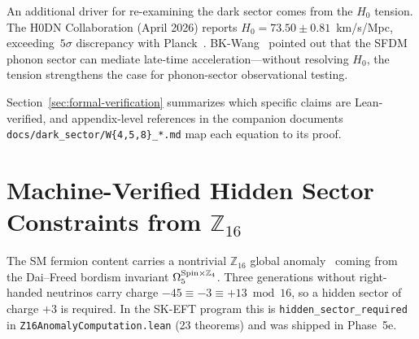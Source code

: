 \documentclass[aps,prd,twocolumn,showpacs,superscriptaddress,nofootinbib]{revtex4-2}
\begin{document}
An additional driver for re-examining the dark sector comes from the $H_0$
tension. The H0DN Collaboration (April 2026) reports
$H_0 = 73.50 \pm 0.81$~km/s/Mpc, exceeding~$5\sigma$ discrepancy with
Planck~\cite{Planck2018}. BK-Wang~\cite{BKWang2017} pointed out that the
SFDM phonon sector can mediate late-time acceleration---without resolving
$H_0$, the tension strengthens the case for phonon-sector observational
testing.

Section~\ref{sec:formal-verification} summarizes which specific claims are
Lean-verified, and appendix-level references in the companion documents
\texttt{docs/dark\_sector/W\{4,5,8\}\_*.md} map each equation to its proof.

\section{Machine-Verified Hidden Sector Constraints from $\mathbb{Z}_{16}$}
\label{sec:z16}

The SM fermion content carries a nontrivial $\mathbb{Z}_{16}$ global
anomaly~\cite{Wan2019,Wang2020,Garcia-Etxebarria2019} coming from the
Dai--Freed bordism invariant $\Omega^{{\rm Spin} \times \mathbb{Z}_4}_5$.
Three generations without right-handed neutrinos carry charge
$-45 \equiv -3 \equiv +13 \bmod 16$, so a hidden sector of charge $+3$
is required. In the SK-EFT program this is \texttt{hidden\_sector\_required}
in \texttt{Z16AnomalyComputation.lean} (23 theorems) and was shipped in
Phase~5e.
\end{document}
